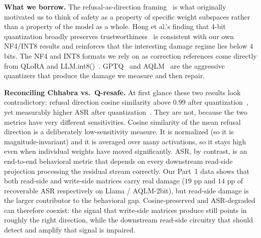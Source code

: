 \documentclass[11pt]{article}
\begin{document}
\textbf{What we borrow.} The refusal-as-direction framing~\cite{arditi2024refusal} is what originally motivated us to think of safety as a property of specific weight subspaces rather than a property of the model as a whole. Hong et al.'s finding that 4-bit quantization broadly preserves trustworthiness~\cite{hong2024compressed} is consistent with our own NF4/INT8 results and reinforces that the interesting damage regime lies below 4 bits. The NF4 and INT8 formats we rely on as correction references come directly from QLoRA and LLM.int8()~\cite{dettmers2022llmint8, dettmers2023qlora}. GPTQ~\cite{frantar2022gptq} and AQLM~\cite{egiazarian2024aqlm} are the aggressive quantizers that produce the damage we measure and then repair.

\textbf{Reconciling Chhabra vs.\ Q-resafe.} At first glance these two results look contradictory: refusal direction cosine similarity above $0.99$ after quantization~\cite{chhabra2025aird}, yet measurably higher ASR after quantization~\cite{qresafe2025}. They are not, because the two metrics have very different sensitivities. Cosine similarity of the mean refusal direction is a deliberately low-sensitivity measure. It is normalized (so it is magnitude-invariant) and it is averaged over many activations, so it stays high even when individual weights have moved significantly. ASR, by contrast, is an end-to-end behavioral metric that depends on every downstream read-side projection processing the residual stream correctly. Our Part~1 data shows that both read-side and write-side matrices carry real damage ($19$ pp and $14$ pp of recoverable ASR respectively on Llama / AQLM-2bit), but read-side damage is the larger contributor to the behavioral gap. Cosine-preserved and ASR-degraded can therefore coexist: the signal that write-side matrices produce still points in roughly the right direction, while the downstream read-side circuitry that should detect and amplify that signal is impaired.
\end{document}
